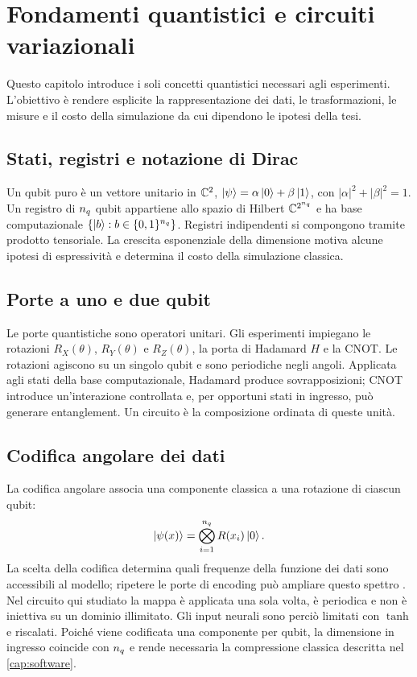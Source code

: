 \chapter{Fondamenti quantistici e circuiti variazionali}
\label{cap:fondamenti-quantistici}

Questo capitolo introduce i soli concetti quantistici necessari agli
esperimenti. L'obiettivo è rendere esplicite la rappresentazione dei dati, le
trasformazioni, le misure e il costo della simulazione da cui dipendono le
ipotesi della tesi.

\section{Stati, registri e notazione di Dirac}
\label{sec:hilbert}

Un qubit puro è un vettore unitario in $\mathbb{C}^2$,
$\ket{\psi}=\alpha\ket{0}+\beta\ket{1}$, con
$|\alpha|^2+|\beta|^2=1$. Un registro di $n_q$ qubit appartiene allo spazio di
Hilbert $\mathbb{C}^{2^{n_q}}$ e ha base computazionale
$\{\ket{b}:b\in\{0,1\}^{n_q}\}$. Registri indipendenti si compongono tramite
prodotto tensoriale. La crescita esponenziale della dimensione motiva alcune
ipotesi di espressività e determina il costo della simulazione classica.

\section{Porte a uno e due qubit}
\label{sec:porte}

Le porte quantistiche sono operatori unitari. Gli esperimenti impiegano le
rotazioni $R_X(\theta)$, $R_Y(\theta)$ e $R_Z(\theta)$, la porta di Hadamard
$H$ e la CNOT. Le rotazioni agiscono su un singolo qubit e sono periodiche negli
angoli. Applicata agli stati della base computazionale, Hadamard produce
sovrapposizioni; CNOT introduce un'interazione controllata e, per opportuni
stati in ingresso, può generare entanglement. Un circuito è la composizione
ordinata di queste unità.

\section{Codifica angolare dei dati}
\label{sec:angle-embedding}

La codifica angolare associa una componente classica a una rotazione di ciascun
qubit:
\begin{equation}
  \ket{\psi(x)}=\bigotimes_{i=1}^{n_q}R(x_i)\ket{0}.
  \label{eq:angle-embedding}
\end{equation}
La scelta della codifica determina quali frequenze della funzione dei dati sono
accessibili al modello; ripetere le porte di encoding può ampliare questo
spettro \parencite{schuld2021encoding}. Nel circuito qui studiato la mappa è
applicata una sola volta, è periodica e non è iniettiva su un dominio
illimitato. Gli input neurali sono perciò limitati con $\tanh$ e riscalati.
Poiché viene codificata una componente per qubit, la dimensione in ingresso
coincide con $n_q$ e rende necessaria la compressione classica descritta nel
\cref{cap:software}.

